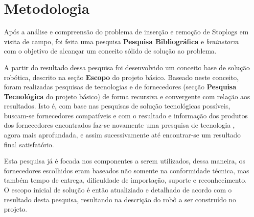 
\setcounter{secnumdepth}{3}
\section{Metodologia}
\label{metodologia}

Após a análise e compreensão do problema de inserção e remoção de Stoplogs em visita de campo, foi feita uma pesquisa
\textbf{Pesquisa Bibliográfica} e \emph{brainstorm} com o objetivo de alcançar um conceito sólido de solução ao problema. 

A partir do resultado dessa pesquisa foi desenvolvido um conceito base de solução robótica, descrito na seção {\bf Escopo} do projeto básico. Baseado neste conceito, foram realizadas pesquisas de tecnologias e de fornecedores (secção  {\bf Pesquisa Tecnológica} do projeto básico) de forma recursiva e convergente com relação aos resultados. Isto
é, com base nas pesquisas de solução tecnológicas possíveis, buscam-se fornecedores compatíveis e com o
resultado e informação dos produtos dos fornecedores encontrados faz-se
novamente uma presquisa de tecnologia	, agora mais aprofundada, e assim sucessivamente
até encontrar-se um resultado final satisfatório. 

Esta pesquisa já é focada nos
componentes a serem utilizados, dessa maneira, os fornecedores escolhidos eram
baseados não somente na conformidade técnica, mas também tempo de entrega,
dificuldade de importação, suporte e reconhecimento. O escopo inicial de solução
é então atualiziado e detalhado de acordo com o resultado desta pesquisa, resultando na descrição do robô a ser construído no projeto.
